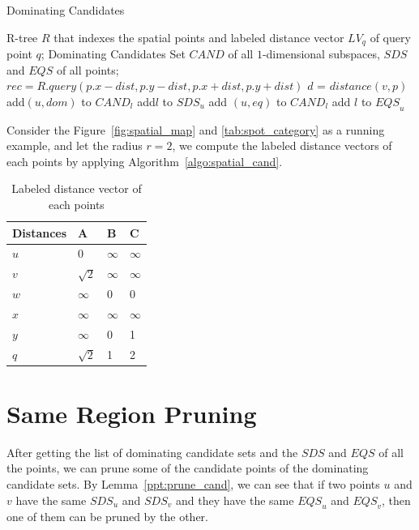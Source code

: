 \begin{algorithm}[H]
  \caption{Dominating Candidates}
  \label{algo:spatial_cand}
  \begin{algorithmic}[1]
  \show\LOOP
    \REQUIRE R-tree $R$ that indexes the spatial points and labeled distance vector $LV_q$ of query point $q$;
    \ENSURE Dominating Candidates Set $\mathit{CAND}$ of all $1$-dimensional subspaces, $\mathit{SDS}$ and $\mathit{EQS}$ of all points;
            \STATE $rec = R.query(p.x-dist, p.y-dist, p.x+dist, p.y+dist)$
                \STATE $d$ = $distance(v, p)$
                    \STATE add$(u, dom)$ to $\mathit{CAND}_l$
                    \STATE add$l$ to $\mathit{SDS}_u$
                \ENDIF
                    \STATE add $(u, eq)$ to $\mathit{CAND}_l$
                    \STATE add $l$ to $\mathit{EQS}_u$
                \ENDIF
            \ENDFOR
            
        \ENDFOR
    \ENDFOR
  \end{algorithmic}
\end{algorithm}

Consider the Figure~\ref{fig:spatial_map} and \ref{tab:spot_category} as a running example, and let the radius $r = 2$, we compute the labeled distance vectors of each points by applying Algorithm~\ref{algo:spatial_cand}.

\begin{table}[h]
    \centering
    \begin{tabular}{llll}
    \hline
    Distances & A & B & C \\ \hline
    $u$       & 0 & $\infty$ & $\infty$ \\ \hline
    $v$       & $\sqrt{2}$ & $\infty$ & $\infty$ \\ \hline
    $w$       & $\infty$ & 0 & 0 \\ \hline
    $x$       & $\infty$ & $\infty$ & $\infty$ \\ \hline
    $y$       & $\infty$ & 0 & 1 \\ \hline
    $q$       & $\sqrt{2}$ & 1 & 2 \\ \hline
    \end{tabular}
    \caption{Labeled distance vector of each points}
    \label{tab:lv_spatial}
\end{table}

\section{Same Region Pruning}
After getting the list of dominating candidate sets and the $\mathit{SDS}$ and $\mathit{EQS}$ of all the points, we can prune some of the candidate points of the dominating candidate sets. By Lemma~\ref{ppt:prune_cand}, we can see that if two points $u$ and $v$ have the same $\mathit{SDS}_u$ and $\mathit{SDS}_v$ and they have the same $\mathit{EQS}_u$ and $\mathit{EQS}_v$, then one of them can be pruned by the other.

